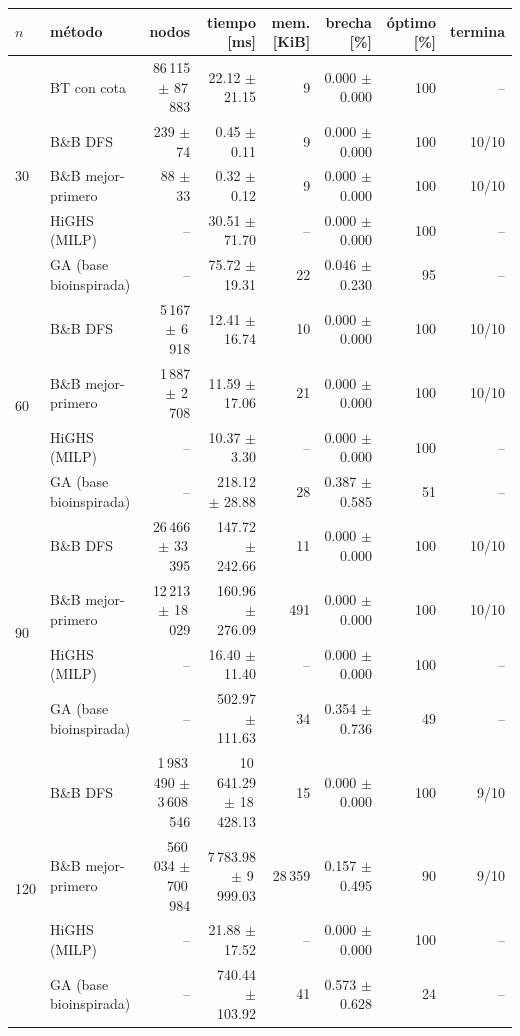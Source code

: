 \begin{tabular}{llrrrrrr}
\toprule
$n$ & método & nodos & tiempo [ms] & mem. [KiB] & brecha [\%] & óptimo [\%] & termina \\
\midrule
\multirow{5}{*}{30} & BT con cota & 86\,115 $\pm$ 87\,883 & 22.12 $\pm$ 21.15 & 9 & 0.000 $\pm$ 0.000 & 100 & -- \\
 & B\&B DFS & 239 $\pm$ 74 & 0.45 $\pm$ 0.11 & 9 & 0.000 $\pm$ 0.000 & 100 & 10/10 \\
 & B\&B mejor-primero & 88 $\pm$ 33 & 0.32 $\pm$ 0.12 & 9 & 0.000 $\pm$ 0.000 & 100 & 10/10 \\
 & HiGHS (MILP) & -- & 30.51 $\pm$ 71.70 & -- & 0.000 $\pm$ 0.000 & 100 & -- \\
 & GA (base bioinspirada) & -- & 75.72 $\pm$ 19.31 & 22 & 0.046 $\pm$ 0.230 & 95 & -- \\
\midrule
\multirow{4}{*}{60} & B\&B DFS & 5\,167 $\pm$ 6\,918 & 12.41 $\pm$ 16.74 & 10 & 0.000 $\pm$ 0.000 & 100 & 10/10 \\
 & B\&B mejor-primero & 1\,887 $\pm$ 2\,708 & 11.59 $\pm$ 17.06 & 21 & 0.000 $\pm$ 0.000 & 100 & 10/10 \\
 & HiGHS (MILP) & -- & 10.37 $\pm$ 3.30 & -- & 0.000 $\pm$ 0.000 & 100 & -- \\
 & GA (base bioinspirada) & -- & 218.12 $\pm$ 28.88 & 28 & 0.387 $\pm$ 0.585 & 51 & -- \\
\midrule
\multirow{4}{*}{90} & B\&B DFS & 26\,466 $\pm$ 33\,395 & 147.72 $\pm$ 242.66 & 11 & 0.000 $\pm$ 0.000 & 100 & 10/10 \\
 & B\&B mejor-primero & 12\,213 $\pm$ 18\,029 & 160.96 $\pm$ 276.09 & 491 & 0.000 $\pm$ 0.000 & 100 & 10/10 \\
 & HiGHS (MILP) & -- & 16.40 $\pm$ 11.40 & -- & 0.000 $\pm$ 0.000 & 100 & -- \\
 & GA (base bioinspirada) & -- & 502.97 $\pm$ 111.63 & 34 & 0.354 $\pm$ 0.736 & 49 & -- \\
\midrule
\multirow{4}{*}{120} & B\&B DFS & 1\,983\,490 $\pm$ 3\,608\,546 & 10\,641.29 $\pm$ 18\,428.13 & 15 & 0.000 $\pm$ 0.000 & 100 & 9/10 \\
 & B\&B mejor-primero & 560\,034 $\pm$ 700\,984 & 7\,783.98 $\pm$ 9\,999.03 & 28\,359 & 0.157 $\pm$ 0.495 & 90 & 9/10 \\
 & HiGHS (MILP) & -- & 21.88 $\pm$ 17.52 & -- & 0.000 $\pm$ 0.000 & 100 & -- \\
 & GA (base bioinspirada) & -- & 740.44 $\pm$ 103.92 & 41 & 0.573 $\pm$ 0.628 & 24 & -- \\
\bottomrule
\end{tabular}
